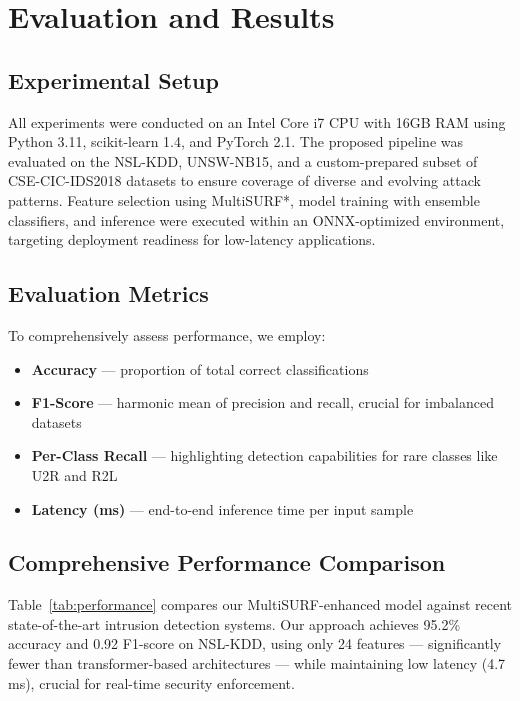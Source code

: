 \documentclass[conference]{IEEEtran}
\begin{document}
\section{Evaluation and Results}

\subsection{Experimental Setup}
All experiments were conducted on an Intel Core i7 CPU with 16GB RAM using Python 3.11, scikit-learn 1.4, and PyTorch 2.1. The proposed pipeline was evaluated on the NSL-KDD, UNSW-NB15, and a custom-prepared subset of CSE-CIC-IDS2018 datasets to ensure coverage of diverse and evolving attack patterns. Feature selection using MultiSURF*, model training with ensemble classifiers, and inference were executed within an ONNX-optimized environment, targeting deployment readiness for low-latency applications.

\subsection{Evaluation Metrics}
To comprehensively assess performance, we employ:
\begin{itemize}
    \item \textbf{Accuracy} — proportion of total correct classifications
    \item \textbf{F1-Score} — harmonic mean of precision and recall, crucial for imbalanced datasets
    \item \textbf{Per-Class Recall} — highlighting detection capabilities for rare classes like U2R and R2L
    \item \textbf{Latency (ms)} — end-to-end inference time per input sample
\end{itemize}

\subsection{Comprehensive Performance Comparison}
Table~\ref{tab:performance} compares our MultiSURF-enhanced model against recent state-of-the-art intrusion detection systems. Our approach achieves 95.2\% accuracy and 0.92 F1-score on NSL-KDD, using only 24 features — significantly fewer than transformer-based architectures — while maintaining low latency (4.7\,ms), crucial for real-time security enforcement.
\end{document}
